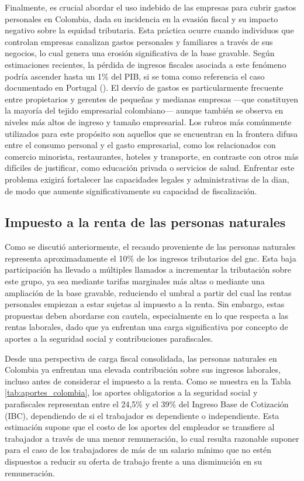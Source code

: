 Finalmente, es crucial abordar el uso indebido de las empresas para cubrir gastos personales en Colombia, dada su incidencia en la evasión fiscal y su impacto negativo sobre la equidad tributaria. Esta práctica ocurre cuando individuos que controlan empresas canalizan gastos personales y familiares a través de sus negocios, lo cual genera una erosión significativa de la base gravable. Según estimaciones recientes, la pérdida de ingresos fiscales asociada a este fenómeno podría ascender hasta un 1\% del PIB, si se toma como referencia el caso documentado en Portugal (\cite{leite2024}). El desvío de gastos es particularmente frecuente entre propietarios y gerentes de pequeñas y medianas empresas —que constituyen la mayoría del tejido empresarial colombiano— aunque también se observa en niveles más altos de ingreso y tamaño empresarial. Los rubros más comúnmente utilizados para este propósito son aquellos que se encuentran en la frontera difusa entre el consumo personal y el gasto empresarial, como los relacionados con comercio minorista, restaurantes, hoteles y transporte, en contraste con otros más difíciles de justificar, como educación privada o servicios de salud. Enfrentar este problema exigirá fortalecer las capacidades legales y administrativas de la \gls{dian}, de modo que aumente significativamente su capacidad de fiscalización.

\subsection{Impuesto a la renta de las personas naturales}

Como se discutió anteriormente, el recaudo proveniente de las personas naturales representa aproximadamente el 10\% de los ingresos tributarios del \gls{gnc}. Esta baja participación ha llevado a múltiples llamados a incrementar la tributación sobre este grupo, ya sea mediante tarifas marginales más altas o mediante una ampliación de la base gravable, reduciendo el umbral a partir del cual las rentas personales empiezan a estar sujetas al impuesto a la renta. Sin embargo, estas propuestas deben abordarse con cautela, especialmente en lo que respecta a las rentas laborales, dado que ya enfrentan una carga significativa por concepto de aportes a la seguridad social y contribuciones parafiscales.



Desde una perspectiva de carga fiscal consolidada, las personas naturales en Colombia ya enfrentan una elevada contribución sobre sus ingresos laborales, incluso antes de considerar el impuesto a la renta. Como se muestra en la Tabla \ref{tab:aportes_colombia}, los aportes obligatorios a la seguridad social y parafiscales representan entre el 24,5\% y el 39\% del Ingreso Base de Cotización (IBC), dependiendo de si el trabajador es dependiente o independiente. Esta estimación supone que el costo de los aportes del empleador se transfiere al trabajador a través de una menor remuneración, lo cual resulta razonable suponer para el caso de los trabajadores de más de un salario mínimo que no estén dispuestos a reducir su oferta de trabajo frente a una disminución en su remuneración. 

